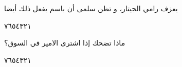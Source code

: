 \documentclass[11pt, a4paper]{article}
\begin{document}
{\vspace{0.5\baselineskip}\begin{flushright}
\textarabic{يعزف رامي الجيتار، و تظن سلمى أن باسم يفعل ذلك أيضا}
\end{flushright}

\begin{center}
        \hfill\textarabic{٧}\hfill\textarabic{٦}\hfill\textarabic{٥}\hfill\textarabic{٤}\hfill\textarabic{٣}\hfill\textarabic{٢}\hfill\textarabic{١}
        \end{center}


\vspace{0.5\baselineskip}\begin{flushright}
\textarabic{ماذا تضحك إذا اشترى الامير في السوق؟}
\end{flushright}

\begin{center}
        \hfill\textarabic{٧}\hfill\textarabic{٦}\hfill\textarabic{٥}\hfill\textarabic{٤}\hfill\textarabic{٣}\hfill\textarabic{٢}\hfill\textarabic{١}
        \end{center}


\vspace{0.5\baselineskip}}



\vfill
\end{document}
